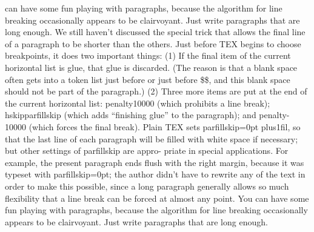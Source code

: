 can have some fun playing with paragraphs, because the algorithm for line breaking
occasionally appears to be clairvoyant. Just write paragraphs that are long enough.
\hfil\vadjust{\vskip\parskip}\break\indent
We still haven’t discussed the special trick that allows the final line of a paragraph 
to be shorter than the others. Just before TEX begins to choose breakpoints, 
it does two important things: (1) If the final item of the current horizontal
list is glue, that glue is discarded. (The reason is that a blank space often gets into a
token list just before or just before \$\$, and this blank space should not be part
of the paragraph.) (2) Three more items are put at the end of the current horizontal
list: penalty10000 (which prohibits a line break); hskipparfillskip (which adds
“finishing glue” to the paragraph); and penalty-10000 (which forces the final break).
Plain TEX sets parfillskip=0pt plus1fil, so that the last line of each paragraph will
be filled with white space if necessary; but other settings of parfillskip are appro-
priate in special applications. For example, the present paragraph ends flush with the
right margin, because it was typeset with parfillskip=0pt; the author didn’t have to
rewrite any of the text in order to make this possible, since a long paragraph generally
allows so much flexibility that a line break can be forced at almost any point. You
can have some fun playing with paragraphs, because the algorithm for line breaking
occasionally appears to be clairvoyant. Just write paragraphs that are long enough.

\bye
